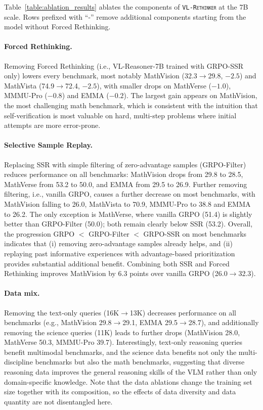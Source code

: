 \documentclass{article}
\newcommand{\model}{\texttt{\textsc{VL-Rethinker}}\xspace}
\begin{document}
Table~\ref{table:ablation_results} ablates the components of \model at the 7B scale. Rows prefixed with ``-'' remove additional components starting from the model without Forced Rethinking.

\paragraph{Forced Rethinking.} Removing Forced Rethinking (i.e., VL-Reasoner-7B trained with GRPO-SSR only) lowers every benchmark, most notably MathVision (32.3$\rightarrow$29.8, $-2.5$) and MathVista (74.9$\rightarrow$72.4, $-2.5$), with smaller drops on MathVerse ($-1.0$), MMMU-Pro ($-0.8$) and EMMA ($-0.2$). The largest gain appears on MathVision, the most challenging math benchmark, which is consistent with the intuition that self-verification is most valuable on hard, multi-step problems where initial attempts are more error-prone.

\paragraph{Selective Sample Replay.} Replacing SSR with simple filtering of zero-advantage samples (GRPO-Filter) reduces performance on all benchmarks: MathVision drops from 29.8 to 28.5, MathVerse from 53.2 to 50.0, and EMMA from 29.5 to 26.9. Further removing filtering, i.e., vanilla GRPO, causes a further decrease on most benchmarks, with MathVision falling to 26.0, MathVista to 70.9, MMMU-Pro to 38.8 and EMMA to 26.2. The only exception is MathVerse, where vanilla GRPO (51.4) is slightly better than GRPO-Filter (50.0); both remain clearly below SSR (53.2). Overall, the progression GRPO $<$ GRPO-Filter $<$ GRPO-SSR on most benchmarks indicates that (i) removing zero-advantage samples already helps, and (ii) replaying past informative experiences with advantage-based prioritization provides substantial additional benefit. Combining both SSR and Forced Rethinking improves MathVision by 6.3 points over vanilla GRPO (26.0$\rightarrow$32.3).

\paragraph{Data mix.} Removing the text-only queries (16K$\rightarrow$13K) decreases performance on all benchmarks (e.g., MathVision 29.8$\rightarrow$29.1, EMMA 29.5$\rightarrow$28.7), and additionally removing the science queries (11K) leads to further drops (MathVision 28.0, MathVerse 50.3, MMMU-Pro 39.7). Interestingly, text-only reasoning queries benefit multimodal benchmarks, and the science data benefits not only the multi-discipline benchmarks but also the math benchmarks, suggesting that diverse reasoning data improves the general reasoning skills of the VLM rather than only domain-specific knowledge. Note that the data ablations change the training set size together with its composition, so the effects of data diversity and data quantity are not disentangled here.
\end{document}
